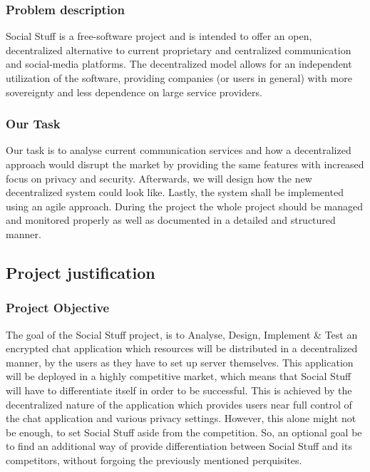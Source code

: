 \subsubsection{Problem description}

Social Stuff is a free-software project and is intended to offer an open, decentralized alternative to current
proprietary and centralized communication and social-media platforms.
The decentralized model allows for an independent utilization of the software, providing companies (or users in general)
with more sovereignty and less dependence on large service providers.

\subsubsection{Our Task}

Our task is to analyse current communication services and how a decentralized approach would disrupt the market by
providing the same features with increased focus on privacy and security.
Afterwards, we will design how the new decentralized system could look like.
Lastly, the system shall be implemented using an agile approach.
During the project the whole project should be managed and monitored properly as well as documented in a detailed and
structured manner.

\subsection{Project justification}\label{subsec:project-justification}

\subsubsection{Project Objective}

The goal of the Social Stuff project, is to Analyse, Design, Implement \& Test an encrypted chat application which
resources will be distributed in a decentralized manner, by the users as they have to set up server themselves.
This application will be deployed in a highly competitive market, which means that Social Stuff will have to
differentiate itself in order to be successful.
This is achieved by the decentralized nature of the application which provides users near full control of the
chat application and various privacy settings.
However, this alone might not be enough, to set Social Stuff aside from the competition.
So, an optional goal be to find an additional way of provide differentiation between Social Stuff and its competitors,
without forgoing the previously mentioned perquisites.

